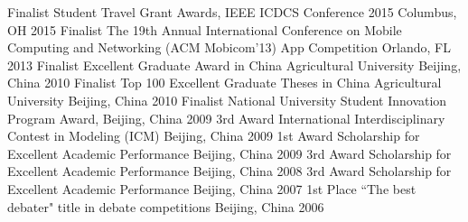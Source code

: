 \begin{cvhonors}
  \cvhonor
    {Finalist}
    {Student Travel Grant Awards, IEEE ICDCS Conference 2015}
    {Columbus, OH }
    {2015}
  \cvhonor
    {Finalist}
    {The 19th Annual International Conference on Mobile Computing and Networking (ACM Mobicom'13) App Competition}
    {Orlando, FL}
    {2013}
  \cvhonor
    {Finalist}
    {Excellent Graduate Award in China Agricultural University}
    {Beijing, China}
    {2010}
  \cvhonor
    {Finalist}
    {Top 100 Excellent Graduate Theses in China Agricultural University}
    {Beijing, China}
    {2010}
  \cvhonor
    {Finalist}
    {National University Student Innovation Program Award,}
    {Beijing, China}
    {2009}
      \cvhonor
    {3rd Award}
    {International Interdisciplinary Contest in Modeling (ICM)}
    {Beijing, China}
    {2009}
          \cvhonor
     {1st Award}
    { Scholarship for Excellent Academic Performance}
    {Beijing, China}
    {2009}
          \cvhonor
     {3rd Award}
    { Scholarship for Excellent Academic Performance}
    {Beijing, China}
    {2008}
      \cvhonor
     {3rd Award}
    { Scholarship for Excellent Academic Performance}
    {Beijing, China}
    {2007}
          \cvhonor
     {1st Place}
    {``The best debater"  title in debate competitions}
    {Beijing, China}
    {2006}
\end{cvhonors}
